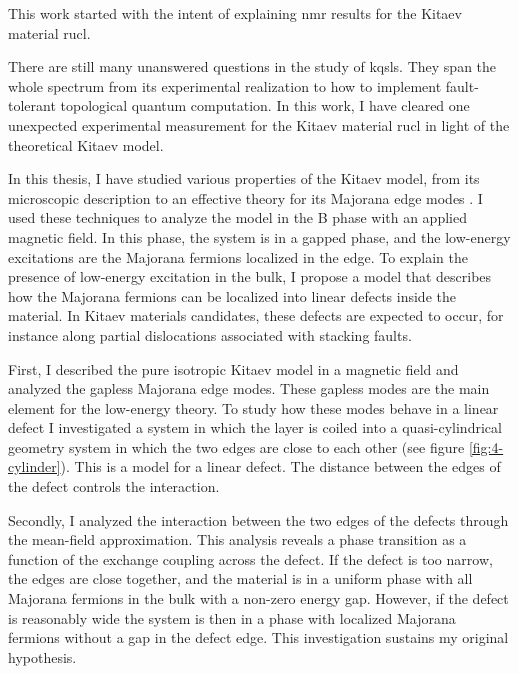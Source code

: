 

This work started with the intent of explaining \acrshort{nmr} results for the Kitaev material \acrshort{rucl}. 

There are still many unanswered questions in the study of \acrshort{kqsl}s. They span the whole spectrum from its experimental realization to how to implement fault-tolerant topological quantum computation. In this work, I have cleared one unexpected experimental measurement for the Kitaev material \acrshort{rucl} in light of the theoretical Kitaev model.

In this thesis,  I have studied various properties of the Kitaev model, from its microscopic description to an effective theory for its Majorana edge modes%
. I used these techniques to analyze the model in the B phase with an applied magnetic field.  In this phase, the system is in a gapped phase, and the low-energy excitations are the Majorana fermions localized in the edge.  To explain the presence of low-energy excitation in the bulk, I propose a model that describes how the Majorana fermions can be localized into linear defects inside the material. In Kitaev materials candidates, these defects are expected to occur, for instance along partial dislocations associated with stacking faults.

First, I described the pure isotropic Kitaev model in a magnetic field and analyzed the gapless Majorana edge modes. These gapless modes are the main element for the low-energy theory. To study how these modes behave in a linear defect I investigated a system in which the layer is coiled into a quasi-cylindrical geometry system in which the two edges are close to each other (see figure \ref{fig:4-cylinder}).  This is a model for a linear defect. The distance between the edges of the defect controls the interaction. 

Secondly, I analyzed the interaction between the two edges of the defects through the mean-field approximation.  This analysis reveals a phase transition as a function of the exchange coupling across the defect. If the defect is too narrow, the edges are close together, and the material is in a uniform phase with all Majorana fermions in the bulk with a non-zero energy gap. However, if the defect is reasonably wide the system is then in a phase with localized Majorana fermions without a gap in the defect edge. This investigation sustains my original hypothesis.

